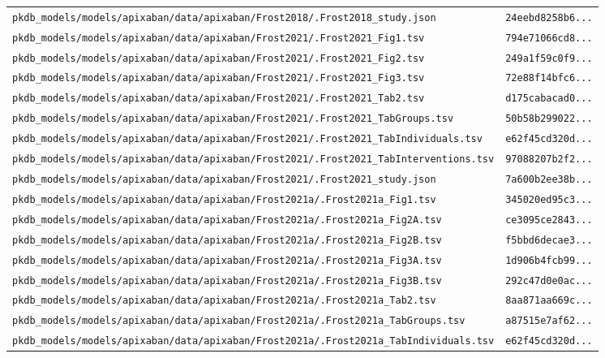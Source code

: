 \begin{longtable}{ll}
\texttt{pkdb\_models/models/apixaban/data/apixaban/Frost2018/.Frost2018\_study.json} & \texttt{24eebd8258b6...} \\
\texttt{pkdb\_models/models/apixaban/data/apixaban/Frost2021/.Frost2021\_Fig1.tsv} & \texttt{794e71066cd8...} \\
\texttt{pkdb\_models/models/apixaban/data/apixaban/Frost2021/.Frost2021\_Fig2.tsv} & \texttt{249a1f59c0f9...} \\
\texttt{pkdb\_models/models/apixaban/data/apixaban/Frost2021/.Frost2021\_Fig3.tsv} & \texttt{72e88f14bfc6...} \\
\texttt{pkdb\_models/models/apixaban/data/apixaban/Frost2021/.Frost2021\_Tab2.tsv} & \texttt{d175cabacad0...} \\
\texttt{pkdb\_models/models/apixaban/data/apixaban/Frost2021/.Frost2021\_TabGroups.tsv} & \texttt{50b58b299022...} \\
\texttt{pkdb\_models/models/apixaban/data/apixaban/Frost2021/.Frost2021\_TabIndividuals.tsv} & \texttt{e62f45cd320d...} \\
\texttt{pkdb\_models/models/apixaban/data/apixaban/Frost2021/.Frost2021\_TabInterventions.tsv} & \texttt{97088207b2f2...} \\
\texttt{pkdb\_models/models/apixaban/data/apixaban/Frost2021/.Frost2021\_study.json} & \texttt{7a600b2ee38b...} \\
\texttt{pkdb\_models/models/apixaban/data/apixaban/Frost2021a/.Frost2021a\_Fig1.tsv} & \texttt{345020ed95c3...} \\
\texttt{pkdb\_models/models/apixaban/data/apixaban/Frost2021a/.Frost2021a\_Fig2A.tsv} & \texttt{ce3095ce2843...} \\
\texttt{pkdb\_models/models/apixaban/data/apixaban/Frost2021a/.Frost2021a\_Fig2B.tsv} & \texttt{f5bbd6decae3...} \\
\texttt{pkdb\_models/models/apixaban/data/apixaban/Frost2021a/.Frost2021a\_Fig3A.tsv} & \texttt{1d906b4fcb99...} \\
\texttt{pkdb\_models/models/apixaban/data/apixaban/Frost2021a/.Frost2021a\_Fig3B.tsv} & \texttt{292c47d0e0ac...} \\
\texttt{pkdb\_models/models/apixaban/data/apixaban/Frost2021a/.Frost2021a\_Tab2.tsv} & \texttt{8aa871aa669c...} \\
\texttt{pkdb\_models/models/apixaban/data/apixaban/Frost2021a/.Frost2021a\_TabGroups.tsv} & \texttt{a87515e7af62...} \\
\texttt{pkdb\_models/models/apixaban/data/apixaban/Frost2021a/.Frost2021a\_TabIndividuals.tsv} & \texttt{e62f45cd320d...} \\

\end{longtable}
